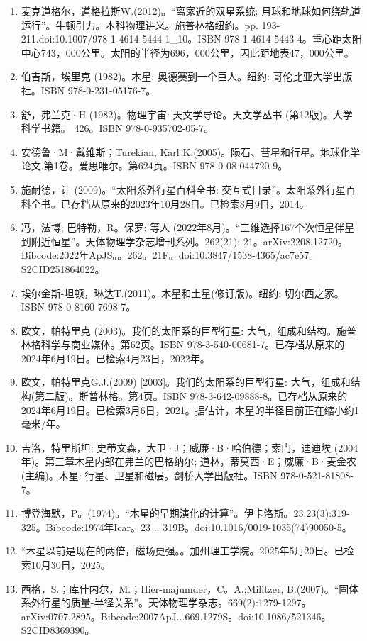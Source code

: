 \begin{enumerate}
\item 麦克道格尔，道格拉斯W.(2012)。“离家近的双星系统: 月球和地球如何绕轨道运行”。牛顿引力。本科物理讲义。施普林格纽约。pp. 193-211.doi:10.1007/978-1-4614-5444-1_10。ISBN 978-1-4614-5443-4。重心距太阳中心743，000公里。太阳的半径为696，000公里，因此距地表47，000公里。
\item 伯吉斯，埃里克 (1982)。木星: 奥德赛到一个巨人。纽约: 哥伦比亚大学出版社。ISBN 978-0-231-05176-7。
\item 舒，弗兰克·H (1982)。物理宇宙: 天文学导论。天文学丛书 (第12版)。大学科学书籍。 426。ISBN 978-0-935702-05-7。
\item 安德鲁·M·戴维斯；Turekian, Karl K.(2005)。陨石、彗星和行星。地球化学论文.第1卷。爱思唯尔。第624页。ISBN 978-0-08-044720-9。
\item 施耐德，让 (2009)。“太阳系外行星百科全书: 交互式目录”。太阳系外行星百科全书。已存档从原来的2023年10月28日。已检索8月9日，2014。
\item 冯，法博; 巴特勒，R。保罗; 等人 (2022年8月)。“三维选择167个次恒星伴星到附近恒星”。天体物理学杂志增刊系列。262(21): 21。arXiv:2208.12720。Bibcode:2022年ApJS。。262。21F。doi:10.3847/1538-4365/ac7e57。S2CID251864022。 
\item 埃尔金斯-坦顿，琳达T.(2011)。木星和土星(修订版)。纽约: 切尔西之家。ISBN 978-0-8160-7698-7。
\item 欧文，帕特里克 (2003)。我们的太阳系的巨型行星: 大气，组成和结构。施普林格科学与商业媒体。第62页。ISBN 978-3-540-00681-7。已存档从原来的2024年6月19日。已检索4月23日，2022年。
\item 欧文，帕特里克G.J.(2009) [2003]。我们的太阳系的巨型行星: 大气，组成和结构(第二版)。斯普林格。第4页。ISBN 978-3-642-09888-8。已存档从原来的2024年6月19日。已检索3月6日，2021。据估计，木星的半径目前正在缩小约1毫米/年。
\item 吉洛，特里斯坦; 史蒂文森，大卫·J；威廉·B·哈伯德；索门，迪迪埃 (2004年)。第三章木星内部在弗兰的巴格纳尔; 道林，蒂莫西·E；威廉·B·麦金农 (主编)。木星: 行星、卫星和磁层。剑桥大学出版社。ISBN 978-0-521-81808-7。
\item 博登海默，P。(1974)。“木星的早期演化的计算”。伊卡洛斯。23.23(3):319-325。Bibcode:1974年Icar。23 .. 319B。doi:10.1016/0019-1035(74)90050-5。
\item “木星以前是现在的两倍，磁场更强。。加州理工学院。2025年5月20日。已检索10月30日，2025。
\item 西格，S.；库什内尔，M.；Hier-majumder，C。A.;Militzer, B.(2007)。“固体系外行星的质量-半径关系”。天体物理学杂志。669(2):1279-1297。arXiv:0707.2895。Bibcode:2007ApJ...669.1279S。doi:10.1086/521346。S2CID8369390。 

\end{enumerate}
